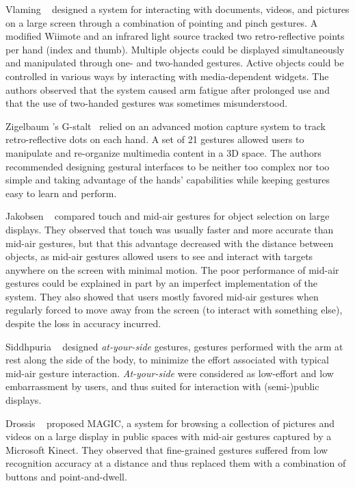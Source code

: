 Vlaming \etal~\cite{Vlaming:2008} designed a system for interacting with documents, videos, and pictures on a large screen through a combination of pointing and pinch gestures. A modified Wiimote and an infrared light source tracked two retro-reflective points per hand (index and thumb). Multiple objects could be displayed simultaneously and manipulated through one- and two-handed gestures. Active objects could be controlled in various ways by interacting with media-dependent widgets. The authors observed that the system caused arm fatigue after prolonged use and that the use of two-handed gestures was sometimes misunderstood. 

Zigelbaum \etal's G-stalt~\cite{Zigelbaum:2010} relied on an advanced motion capture system to track retro-reflective dots on each hand. A set of 21 gestures allowed users to manipulate and re-organize multimedia content in a 3D space. The authors recommended designing gestural interfaces to be neither too complex nor too simple and taking advantage of the hands' capabilities while keeping gestures easy to learn and perform.

Jakobsen \etal~\cite{Jakobsen:2015} compared touch and mid-air gestures for object selection on large displays. They observed that touch was usually faster and more accurate than mid-air gestures, but that this advantage decreased with the distance between objects, as mid-air gestures allowed users to see and interact with targets anywhere on the screen with minimal motion. The poor performance of mid-air gestures could be explained in part by an imperfect implementation of the system. They also showed that users mostly favored mid-air gestures when regularly forced to move away from the screen (\eg to interact with something else), despite the loss in accuracy incurred.

Siddhpuria \etal~\cite{Siddhpuria:2017} designed \textit{at-your-side} gestures, \ie gestures performed with the arm at rest along the side of the body, to minimize the effort associated with typical mid-air gesture interaction. \textit{At-your-side} were considered as low-effort and low embarrassment by users, and thus suited for interaction with (semi-)public displays.

Drossis \etal~\cite{Drossis:2013} proposed MAGIC, a system for browsing a collection of pictures and videos on a large display in public spaces with mid-air gestures captured by a Microsoft Kinect. They observed that fine-grained gestures suffered from low recognition accuracy at a distance and thus replaced them with a combination of buttons and point-and-dwell.

